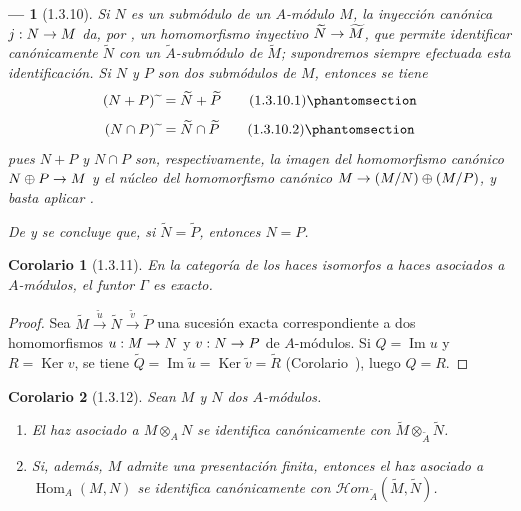 \documentclass[oneside]{amsart}
\theoremstyle{ega-env-style}
\newtheorem*{env}{---}
\theoremstyle{ega-thm-env-style}
\newtheorem*{corollary}{Corolario}
\theoremstyle{ega-defn-env-style}
\def\supertilde{{\,\widetilde{\,}\,}}   %
\renewcommand{\to}{\mathchoice{\longrightarrow}{\rightarrow}{\rightarrow}{\rightarrow}}
\let\EGAOriginalLabel\label
\renewcommand{\label}[1]{\phantomsection\EGAOriginalLabel{#1}}
\begin{document}
\begin{env}[1.3.10]
\label{I.1.3.10}
Si $N$ es un submódulo de un $A$-módulo $M$, la inyección canónica $j:N\to M$ da, por , un homomorfismo inyectivo $\widetilde{N}\to\widetilde{M}$, que permite identificar canónicamente $\widetilde{N}$ con un \emph{$\widetilde{A}$-submódulo} de $\widetilde{M}$;
supondremos siempre efectuada esta identificación.
Si $N$ y $P$ son dos submódulos de $M$, entonces se tiene
\begin{equation}
  (N+P)\supertilde=\widetilde{N}+\widetilde{P}
  \tag{1.3.10.1}\label{I.1.3.10.1-fr}
\end{equation}
\begin{equation}
  (N\cap P)\supertilde=\widetilde{N}\cap\widetilde{P}
  \tag{1.3.10.2}\label{I.1.3.10.2-fr}
\end{equation}
pues $N+P$ y $N\cap P$ son, respectivamente, la imagen del homomorfismo canónico
$N\oplus P\to M$ y el núcleo del homomorfismo canónico $M\to(M/N)\oplus(M/P)$, y basta aplicar .

De  y  se concluye que, si $\widetilde{N}=\widetilde{P}$, entonces $N=P$.
\end{env}

\begin{corollary}[1.3.11]
\label{I.1.3.11}
En la categoría de los haces isomorfos a haces asociados a $A$-módulos, el funtor $\Gamma$ es exacto.
\end{corollary}

\begin{proof}
Sea $\widetilde{M}\xrightarrow{\widetilde{u}}\widetilde{N}
\xrightarrow{\widetilde{v}}\widetilde{P}$ una sucesión exacta correspondiente a dos homomorfismos $u:M\to N$ y $v:N\to P$ de $A$-módulos.
Si $Q=\operatorname{Im}u$ y $R=\operatorname{Ker}v$, se tiene $\widetilde{Q}=\operatorname{Im}\widetilde{u}
=\operatorname{Ker}\widetilde{v}=\widetilde{R}$ (Corolario~), luego $Q=R$.
\end{proof}

\begin{corollary}[1.3.12]
\label{I.1.3.12}
Sean $M$ y $N$ dos $A$-módulos.
\begin{enumerate}
  \item[{\rm(i)}] El haz asociado a $M\otimes_A N$ se identifica canónicamente con $\widetilde{M}\otimes_{\widetilde{A}}\widetilde{N}$.
  \item[{\rm(ii)}] Si, además, $M$ admite una presentación finita, entonces el haz asociado a $\operatorname{Hom}_A(M,N)$ se identifica canónicamente con $\mathscr{H}\!om_{\widetilde{A}}(\widetilde{M},\widetilde{N})$.
\end{enumerate}
\end{corollary}
\end{document}
